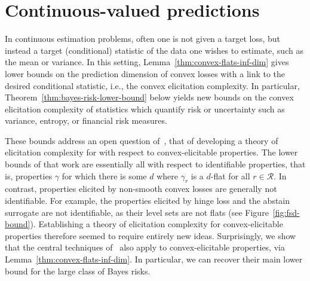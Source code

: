 \documentclass[anon,12pt]{colt2021} %
\newcommand{\R}{\mathcal{R}}
\newcommand{\ones}{\mathbbm{1}}
\begin{document}
\section{Continuous-valued predictions}\label{sec:contin-consis}

In continuous estimation problems, often one is not given a target loss, but instead a target (conditional) statistic of the data one wishes to estimate, such as the mean or variance.
In this setting, Lemma~\ref{thm:convex-flats-inf-dim} gives lower bounds on the prediction dimension of convex losses with a link to the desired conditional statistic, i.e., the convex elicitation complexity.
In particular,
Theorem~\ref{thm:bayes-risk-lower-bound} below yields new bounds on the convex elicitation complexity of statistics which quantify risk or uncertainty such as variance, entropy, or financial risk measures.

These bounds address an open question of~\citet{frongillo2020elicitation}, that of developing a theory of elicitation complexity for with respect to convex-elicitable properties.
The lower bounds of that work are essentially all with respect to identifiable properties, that is, properties $\gamma$ for which there is some $d$ where $\gamma_r$ is a $d$-flat for all $r\in\R$.
In contrast, properties elicited by non-smooth convex losses are generally not identifiable.
For example, the properties elicited by hinge loss and the abstain surrogate are not identifiable, as their level sets are not flats (see Figure~\ref{fig:fsd-bound}).
Establishing a theory of elicitation complexity for convex-elicitable properties therefore seemed to require entirely new ideas.
Surprisingly, we show that the central techniques of~\citet{frongillo2020elicitation} also apply to convex-elicitable properties, via Lemma~\ref{thm:convex-flats-inf-dim}.
In particular, we can recover their main lower bound for the large class of Bayes risks.
\end{document}
